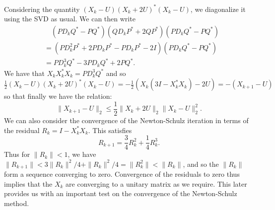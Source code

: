 \documentclass[12pt]{article}
\def\norm#1{\|#1\|}
\begin{document}
Considering the quantity $(X_k - U)(X_k+2U)^*(X_k-U)$, we diagonalize it using
the SVD as usual. We can then write
\begin{align*}
  &\quad(PD_kQ^* - PQ^*)(QD_kP^* + 2QP^*)(PD_kQ^* - PQ^*)\\
  & = (PD_k^2P^* + 2PD_kP^* - PD_kP^* - 2I)(PD_kQ^* - PQ^*)\\
  & = PD_k^3Q^* - 3PD_kQ^* + 2PQ^*\text{.}
\end{align*}
We have that $X_kX_k^*X_k = PD_k^3Q^*$ and so
\begin{math}
  \frac{1}{2}(X_k - U)(X_k+2U)^*(X_k-U) = -\frac{1}{2}(X_k(3I-X_k^*X_k) - 2U) = -(X_{k+1}-U)
\end{math}
so that finally we have the relation:
\begin{equation}
  \norm{X_{k+1}-U}_2 \leq \frac{1}{2}
  \norm{X_k+2U}_2\norm{X_k - U}_2^2\text{.}
\end{equation}
We can also consider the convergence of the Newton-Schulz iteration in
terms of the residual $R_k = I-X_k^*X_k$. This satisfies
\cite[p.~218]{Higham:2008:FM}
\begin{equation*}
  R_{k+1} = \frac{3}{4}R_k^2 + \frac{1}{4}R_k^3\text{.}
\end{equation*}
Thus for $\norm{R_k} < 1$, we have
$\norm{R_{k+1}} < 3\norm{R_k}^2/4 + \norm{R_k}^2/4 = \norm{R_k^2} < \norm{R_k}$,
and so the $\|R_k\|$ form a sequence converging to zero.
Convergence of the residuals to zero thus implies that the $X_k$ are converging
to a unitary matrix as we require.
This later provides us with an important test on the convergence of the
Newton-Schulz method.
\end{document}
